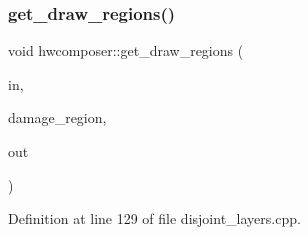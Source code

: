 \subsubsection{\texorpdfstring{get\+\_\+draw\+\_\+regions()}{get\_draw\_regions()}}
{\footnotesize\ttfamily void hwcomposer\+::get\+\_\+draw\+\_\+regions (\begin{DoxyParamCaption}\item[{const std\+::vector$<$ \mbox{\hyperlink{structhwcomposer_1_1Rect}{Rect}}$<$ int $>$$>$ \&}]{in,  }\item[{const Hwc\+Rect$<$ int $>$ \&}]{damage\+\_\+region,  }\item[{std\+::vector$<$ \mbox{\hyperlink{structhwcomposer_1_1RectSet}{Rect\+Set}}$<$ int $>$$>$ $\ast$}]{out }\end{DoxyParamCaption})}



Definition at line 129 of file disjoint\+\_\+layers.\+cpp.


